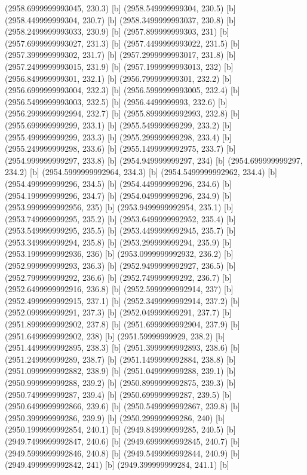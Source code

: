 {{{(2958.6999999993045, 230.3) [b] 
(2958.549999999304, 230.5) [b] 
(2958.449999999304, 230.7) [b] 
(2958.3499999993037, 230.8) [b] 
(2958.2499999993033, 230.9) [b] 
(2957.899999999303, 231) [b] 
(2957.6999999993027, 231.3) [b] 
(2957.4499999993022, 231.5) [b] 
(2957.399999999302, 231.7) [b] 
(2957.2999999993017, 231.8) [b] 
(2957.2499999993015, 231.9) [b] 
(2957.1999999993013, 232) [b] 
(2956.849999999301, 232.1) [b] 
(2956.799999999301, 232.2) [b] 
(2956.6999999993004, 232.3) [b] 
(2956.5999999993005, 232.4) [b] 
(2956.5499999993003, 232.5) [b] 
(2956.4499999993, 232.6) [b] 
(2956.2999999992994, 232.7) [b] 
(2955.8999999992993, 232.8) [b] 
(2955.699999999299, 233.1) [b] 
(2955.549999999299, 233.2) [b] 
(2955.499999999299, 233.3) [b] 
(2955.299999999298, 233.4) [b] 
(2955.249999999298, 233.6) [b] 
(2955.1499999992975, 233.7) [b] 
(2954.999999999297, 233.8) [b] 
(2954.949999999297, 234) [b] 
(2954.699999999297, 234.2) [b] 
(2954.5999999992964, 234.3) [b] 
(2954.5499999992962, 234.4) [b] 
(2954.499999999296, 234.5) [b] 
(2954.449999999296, 234.6) [b] 
(2954.199999999296, 234.7) [b] 
(2954.049999999296, 234.9) [b] 
(2953.9999999992956, 235) [b] 
(2953.9499999992954, 235.1) [b] 
(2953.749999999295, 235.2) [b] 
(2953.6499999992952, 235.4) [b] 
(2953.549999999295, 235.5) [b] 
(2953.4499999992945, 235.7) [b] 
(2953.349999999294, 235.8) [b] 
(2953.299999999294, 235.9) [b] 
(2953.1999999992936, 236) [b] 
(2953.0999999992932, 236.2) [b] 
(2952.999999999293, 236.3) [b] 
(2952.9499999992927, 236.5) [b] 
(2952.799999999292, 236.6) [b] 
(2952.749999999292, 236.7) [b] 
(2952.6499999992916, 236.8) [b] 
(2952.5999999992914, 237) [b] 
(2952.4999999992915, 237.1) [b] 
(2952.3499999992914, 237.2) [b] 
(2952.099999999291, 237.3) [b] 
(2952.049999999291, 237.7) [b] 
(2951.8999999992902, 237.8) [b] 
(2951.6999999992904, 237.9) [b] 
(2951.6499999992902, 238) [b] 
(2951.59999999929, 238.2) [b] 
(2951.4499999992895, 238.3) [b] 
(2951.3999999992893, 238.6) [b] 
(2951.249999999289, 238.7) [b] 
(2951.1499999992884, 238.8) [b] 
(2951.0999999992882, 238.9) [b] 
(2951.049999999288, 239.1) [b] 
(2950.999999999288, 239.2) [b] 
(2950.8999999992875, 239.3) [b] 
(2950.749999999287, 239.4) [b] 
(2950.699999999287, 239.5) [b] 
(2950.6499999992866, 239.6) [b] 
(2950.5499999992867, 239.8) [b] 
(2950.399999999286, 239.9) [b] 
(2950.299999999286, 240) [b] 
(2950.1999999992854, 240.1) [b] 
(2949.849999999285, 240.5) [b] 
(2949.7499999992847, 240.6) [b] 
(2949.6999999992845, 240.7) [b] 
(2949.5999999992846, 240.8) [b] 
(2949.5499999992844, 240.9) [b] 
(2949.4999999992842, 241) [b] 
(2949.399999999284, 241.1) [b] 
}}}
